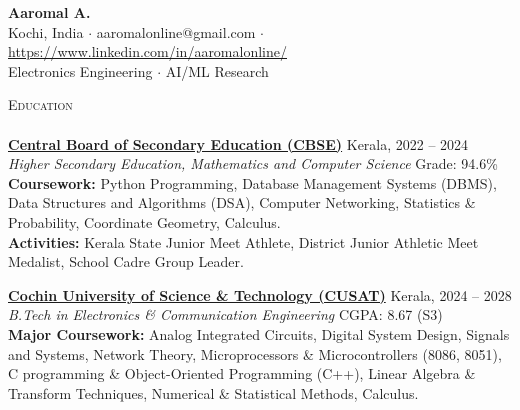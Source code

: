 \documentclass[a4paper]{article}
\newcommand{\lineunder} {
    \vspace*{-8pt} \\
    \hspace*{-18pt} \hrulefill \\
}
\newcommand{\header} [1] {
    {\hspace*{-18pt}\vspace*{6pt} \textsc{#1}}
    \vspace*{-6pt} \lineunder
}
\begin{document}
\vspace*{-40pt}

\vspace*{-10pt}
\vspace*{6mm}
\begin{center}
    {\Huge \textbf{Aaromal A.}}\\
    \vspace{8pt}
    Kochi, India $\cdot$ aaromalonline@gmail.com $\cdot$ \href{https://www.linkedin.com/in/aaromalonline/}{https://www.linkedin.com/in/aaromalonline/} \\
    \vspace{6pt}
    Electronics Engineering $\cdot$ AI/ML Research 
\end{center}
\vspace*{-8pt}

\vspace*{9mm}
\header{Education}
\textbf{\href{https://www.cbse.gov.in/}{Central Board of Secondary Education (CBSE)}} \hfill Kerala, 2022 -- 2024\\
\textit{Higher Secondary Education, Mathematics and Computer Science} \hfill Grade: 94.6\%\\
\textbf{Coursework:} Python Programming, Database Management Systems (DBMS), Data Structures and Algorithms (DSA), Computer Networking, Statistics \& Probability, Coordinate Geometry, Calculus.\\
\textbf{Activities:} Kerala State Junior Meet Athlete, District Junior Athletic Meet Medalist, School Cadre Group Leader.
\vspace{4mm}

\textbf{\href{https://www.cusat.ac.in/}{Cochin University of Science \& Technology (CUSAT)}} \hfill Kerala, 2024 -- 2028\\
\textit{B.Tech in Electronics \& Communication Engineering} \hfill CGPA: 8.67 (S3)\\
\textbf{Major Coursework:} Analog Integrated Circuits, Digital System Design, Signals and Systems, Network Theory, Microprocessors \& Microcontrollers (8086, 8051), C programming \& Object-Oriented Programming (C++), Linear Algebra \& Transform Techniques, Numerical \& Statistical Methods, Calculus.
\vspace*{4mm}
\end{document}
